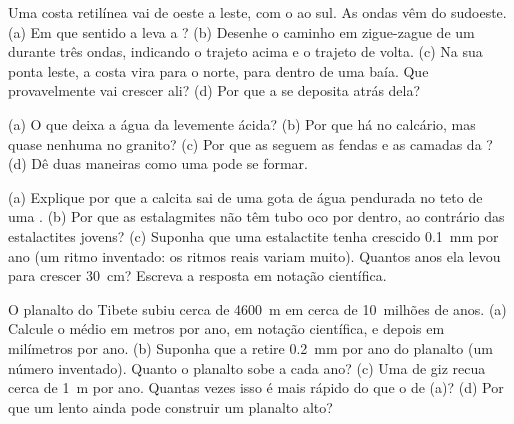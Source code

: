 \begin{exercise}[$\star\star$]\label{exo:g9:landforms:7}
Uma costa retilínea vai de oeste a leste, com o  ao sul. As ondas vêm
do sudoeste. (a) Em que sentido a  leva a ? (b)
Desenhe o caminho em zigue-zague de um  durante três ondas,
indicando o trajeto  acima e o trajeto de volta. (c) Na sua ponta
leste, a costa vira para o norte, para dentro de uma baía. Que  provavelmente vai crescer ali? (d) Por que a  se deposita atrás
dela?
\end{exercise}

\begin{exercise}[$\star\star$]\label{exo:g9:landforms:8}
(a) O que deixa a água da  levemente ácida? (b) Por que há 
no calcário, mas quase nenhuma no granito? (c) Por que as  seguem
as fendas e as camadas da ? (d) Dê duas maneiras como uma 
pode se formar.
\end{exercise}

\begin{exercise}[$\star\star$]\label{exo:g9:landforms:9}
(a) Explique por que a calcita sai de uma gota de água pendurada no teto
de uma . (b) Por que as estalagmites não têm tubo oco por dentro,
ao contrário das estalactites jovens? (c) Suponha que uma estalactite
tenha crescido \qty{0.1}{mm} por ano (um ritmo inventado: os ritmos reais
variam muito). Quantos anos ela levou para crescer \qty{30}{cm}? Escreva
a resposta em notação científica.
\end{exercise}

\begin{exercise}[$\star\star$]\label{exo:g9:landforms:10}
O planalto do Tibete subiu cerca de \qty{4600}{m} em cerca de 10~milhões
de anos. (a) Calcule o  médio em metros por ano, em notação
científica, e depois em milímetros por ano. (b) Suponha que a 
retire \qty{0.2}{mm} por ano do planalto (um número inventado). Quanto o
planalto sobe a cada ano? (c) Uma  de giz recua cerca de
\qty{1}{m} por ano. Quantas vezes isso é mais rápido do que o
 de (a)? (d) Por que um  lento ainda pode
construir um planalto alto?
\end{exercise}

